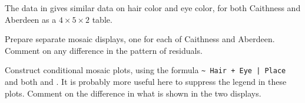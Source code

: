 \documentclass[10pt,krantz2]{krantz}\usepackage[]{graphicx}\usepackage[]{color}
\begin{document}
\begin{Exercises}

  \exercise The  data in  gives similar data on hair color and eye color, for both
  Caithness and Aberdeen as a $4 \times 5 \times 2$ table.
  \begin{enumerate*}
    \item Prepare separate mosaic displays, one for each of Caithness and Aberdeen.  Comment on any difference in
    the pattern of residuals.
    \item Construct conditional mosaic plots, using the formula
      \verb/~ Hair + Eye | Place/ and both  and
    . It is probably more useful here to suppress the legend in these plots.  Comment on the
    difference in what is shown in the two displays.
  \end{enumerate*}
  


\end{Exercises}
\end{document}
